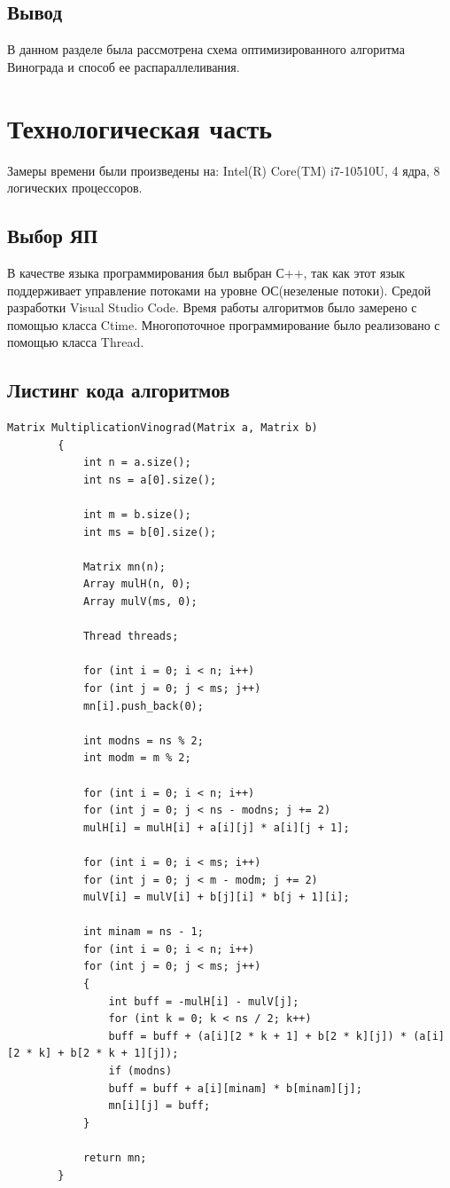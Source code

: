 \documentclass[12pt]{report}
\begin{document}
\section{Вывод}
В данном разделе была рассмотрена схема оптимизированного алгоритма Винограда и способ ее распараллеливания.

\chapter{Технологическая часть}
Замеры времени были произведены на: Intel(R) Core(TM) i7-10510U, 4 ядра, 8 логических процессоров.

\section{Выбор ЯП}
В качестве языка программирования был выбран С++, так как этот
язык поддерживает управление потоками на уровне ОС(незеленые потоки). Средой разработки Visual Studio Code. 
Время работы алгоритмов было замерено с помощью класса Ctime. Многопоточное программирование было
реализовано с помощью класса Thread.


\section{Листинг кода алгоритмов}
\newpage
\begin{lstlisting}[label=some-code,caption= Оптимизированный алгоритм Винограда]
		Matrix MultiplicationVinograd(Matrix a, Matrix b)
		{
			int n = a.size();
			int ns = a[0].size();
			
			int m = b.size();
			int ms = b[0].size();
			
			Matrix mn(n);
			Array mulH(n, 0);
			Array mulV(ms, 0);
			
			Thread threads;
			
			for (int i = 0; i < n; i++)
			for (int j = 0; j < ms; j++)
			mn[i].push_back(0);
			
			int modns = ns % 2;
			int modm = m % 2;
			
			for (int i = 0; i < n; i++)
			for (int j = 0; j < ns - modns; j += 2)
			mulH[i] = mulH[i] + a[i][j] * a[i][j + 1];
			
			for (int i = 0; i < ms; i++)
			for (int j = 0; j < m - modm; j += 2)
			mulV[i] = mulV[i] + b[j][i] * b[j + 1][i];
			
			int minam = ns - 1;
			for (int i = 0; i < n; i++)
			for (int j = 0; j < ms; j++)
			{
				int buff = -mulH[i] - mulV[j];
				for (int k = 0; k < ns / 2; k++)
				buff = buff + (a[i][2 * k + 1] + b[2 * k][j]) * (a[i][2 * k] + b[2 * k + 1][j]);
				if (modns)
				buff = buff + a[i][minam] * b[minam][j];
				mn[i][j] = buff;
			}
			
			return mn;
		}
\end{lstlisting}
\end{document}
